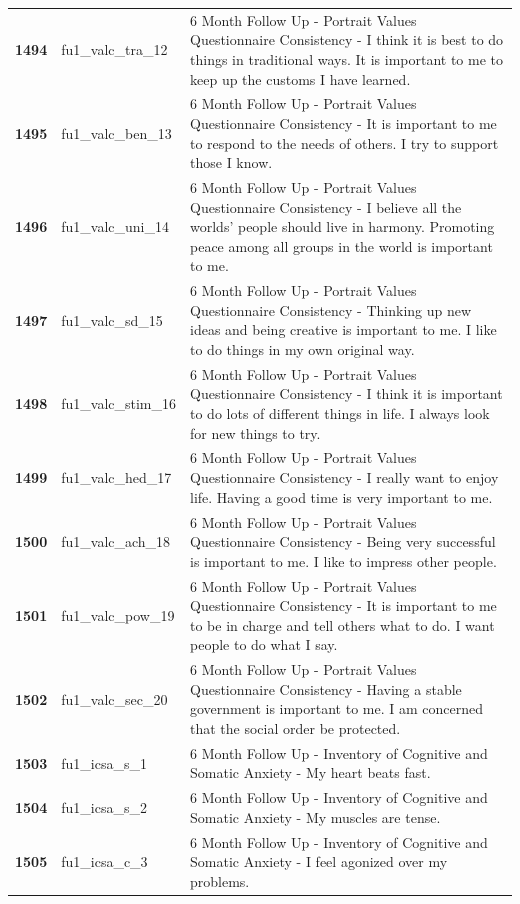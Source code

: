 \documentclass[
  letterpaper,
  DIV=11,
  numbers=noendperiod]{scrartcl}
\begin{document}
\begin{longtable}[t]{>{}cll}
\textbf{1494} & fu1\_valc\_tra\_12 & 6 Month Follow Up - Portrait Values Questionnaire Consistency - I think it is best to do things in traditional ways. It is important to me to keep up the customs I have learned.\\
\textbf{1495} & fu1\_valc\_ben\_13 & 6 Month Follow Up - Portrait Values Questionnaire Consistency - It is important to me to respond to the needs of others. I try to support those I know.\\
\addlinespace
\textbf{1496} & fu1\_valc\_uni\_14 & 6 Month Follow Up - Portrait Values Questionnaire Consistency - I believe all the worlds' people should live in harmony. Promoting peace among all groups in the world is important to me.\\
\textbf{1497} & fu1\_valc\_sd\_15 & 6 Month Follow Up - Portrait Values Questionnaire Consistency - Thinking up new ideas and being creative is important to me. I like to do things in my own original way.\\
\textbf{1498} & fu1\_valc\_stim\_16 & 6 Month Follow Up - Portrait Values Questionnaire Consistency - I think it is important to do lots of different things in life. I always look for new things to try.\\
\textbf{1499} & fu1\_valc\_hed\_17 & 6 Month Follow Up - Portrait Values Questionnaire Consistency - I really want to enjoy life. Having a good time is very important to me.\\
\textbf{1500} & fu1\_valc\_ach\_18 & 6 Month Follow Up - Portrait Values Questionnaire Consistency - Being very successful is important to me. I like to impress other people.\\
\addlinespace
\textbf{1501} & fu1\_valc\_pow\_19 & 6 Month Follow Up - Portrait Values Questionnaire Consistency - It is important to me to be in charge and tell others what to do. I want people to do what I say.\\
\textbf{1502} & fu1\_valc\_sec\_20 & 6 Month Follow Up - Portrait Values Questionnaire Consistency - Having a stable government is important to me. I am concerned that the social order be protected.\\
\textbf{1503} & fu1\_icsa\_s\_1 & 6 Month Follow Up - Inventory of Cognitive and Somatic Anxiety - My heart beats fast.\\
\textbf{1504} & fu1\_icsa\_s\_2 & 6 Month Follow Up - Inventory of Cognitive and Somatic Anxiety - My muscles are tense.\\
\textbf{1505} & fu1\_icsa\_c\_3 & 6 Month Follow Up - Inventory of Cognitive and Somatic Anxiety - I feel agonized over my problems.\\

\end{longtable}
\end{document}
